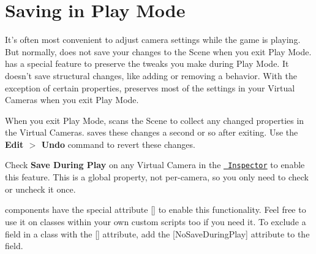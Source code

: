\chapter{Saving in Play Mode}
\hypertarget{md__hey_tea_9_2_library_2_package_cache_2com_8unity_8cinemachine_0d2_89_87_2_documentation_0i_2_cinemachine_saving_during_play}{}\label{md__hey_tea_9_2_library_2_package_cache_2com_8unity_8cinemachine_0d2_89_87_2_documentation_0i_2_cinemachine_saving_during_play}
\label{md__hey_tea_9_2_library_2_package_cache_2com_8unity_8cinemachine_0d2_89_87_2_documentation_0i_2_cinemachine_saving_during_play_autotoc_md715}%
%
 It’s often most convenient to adjust camera settings while the game is playing. But normally,  does not save your changes to the Scene when you exit Play Mode.  has a special feature to preserve the tweaks you make during Play Mode. It doesn’t save structural changes, like adding or removing a behavior. With the exception of certain properties,  preserves most of the settings in your Virtual Cameras when you exit Play Mode.

When you exit Play Mode,  scans the Scene to collect any changed properties in the Virtual Cameras.  saves these changes a second or so after exiting. Use the {\bfseries{Edit \texorpdfstring{$>$}{>} Undo}} command to revert these changes.

Check {\bfseries{Save During Play}} on any Virtual Camera in the \href{https://docs.unity3d.com/Manual/UsingTheInspector.html}{\texttt{ Inspector}} to enable this feature. This is a global property, not per-\/camera, so you only need to check or uncheck it once.

 components have the special attribute {\ttfamily \mbox{[}\mbox{]}} to enable this functionality. Feel free to use it on classes within your own custom scripts too if you need it. To exclude a field in a class with the {\ttfamily \mbox{[}\mbox{]}} attribute, add the {\ttfamily \mbox{[}No\+Save\+During\+Play\mbox{]}} attribute to the field. 